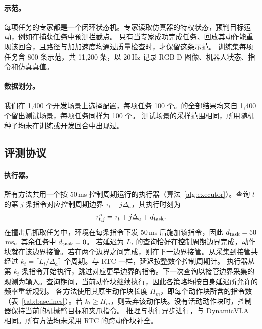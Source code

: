 \paragraph{示范。}
每项任务的专家都是一个闭环状态机。专家读取仿真器的特权状态，预判目标运动，例如在捕获任务中预测拦截点。
只有当专家成功完成任务、回放其动作能重现该回合，且路径与加加速度均通过质量检查时，才保留这条示范。
训练集每项任务含 800 条示范，共 11{,}200 条，以 20\,Hz 记录 RGB-D 图像、机器人状态、指令和仿真真值。

\paragraph{数据划分。}
我们在 1{,}400 个开发场景上选择配置，每项任务 100 个。\bench 的全部结果均来自 1{,}400 个留出测试场景，每项任务同样为 100 个。
测试场景的采样范围相同，所用随机种子均未在训练或开发回合中出现过。

\subsection{评测协议}
\label{app:sweeps}
\paragraph{执行器。}
所有方法共用一个按 50\,ms 控制周期运行的执行器（算法~\ref{alg:executor}）。查询 $t$ 的第 $j$ 条指令对应控制周期边界 $\tau_t+j\Delta_a$，其执行时刻为
\begin{equation}
\tau^{\mathrm a}_{t,j}=\tau_t+j\Delta_a+d_{\rm task}.
\label{eq:apptime}
\end{equation}
在撞击后抓取任务中，环境在每条指令下发 50\,ms 后施加该指令，因此 $d_{\rm task}=50$\,ms。其余任务中 $d_{\rm task}=0$。
若延迟为 $L_t$ 的查询恰好在控制周期边界完成，动作块就在该边界接管。若在两个边界之间完成，则在下一边界接管。从采集到接管共经过 $k_t=\lceil L_t/\Delta_a\rceil$ 个周期。与 RTC \cite{rtc} 一样，延迟按整数个控制周期计。
执行器从第 $k_t$ 条指令开始执行，跳过对应更早边界的指令。下一次查询以接管边界采集的观测为输入。查询期间，当前动作块继续执行，因此各策略均按自身延迟所允许的频率重新规划。
各方法使用其原生动作块长度 $H_m$，即每个动作块所含的指令数（表~\ref{tab:baselines}）。若 $k_t\ge H_m$，则丢弃该动作块。没有活动动作块时，控制器保持当前的机械臂目标和夹爪指令。
推理与执行异步进行，与 DynamicVLA \cite{dynamicvla} 相同。所有方法均未采用 RTC 的跨动作块补全。

